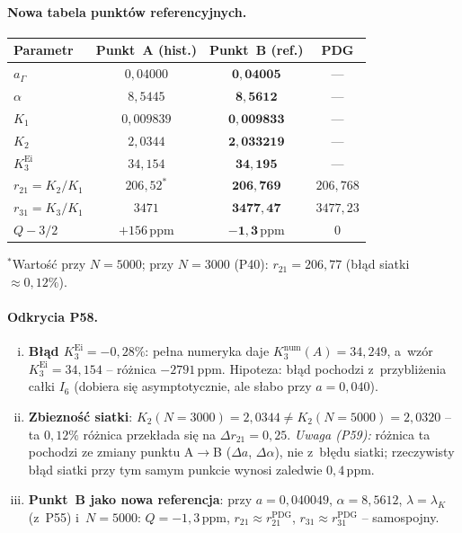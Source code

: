 \paragraph{Nowa tabela punkt\'ow referencyjnych.}
\begin{center}
\begin{tabular}{lccc}
\toprule
Parametr & Punkt~A (hist.) & Punkt~B (ref.) & PDG\\\midrule
$a_\Gamma$        & $0{,}04000$ & $\mathbf{0{,}04005}$ & --- \\
$\alpha$          & $8{,}5445$  & $\mathbf{8{,}5612}$  & --- \\
$K_1$             & $0{,}009839$& $\mathbf{0{,}009833}$& --- \\
$K_2$             & $2{,}0344$  & $\mathbf{2{,}033219}$& --- \\
$K_3^{\mathrm{Ei}}$ & $34{,}154$& $\mathbf{34{,}195}$  & --- \\
$r_{21}=K_2/K_1$  & $206{,}52^*$ & $\mathbf{206{,}769}$ & $206{,}768$ \\
$r_{31}=K_3/K_1$  & $3471$     & $\mathbf{3477{,}47}$ & $3477{,}23$ \\
$Q-3/2$           & $+156\,\mathrm{ppm}$ & $\mathbf{-1{,}3\,\mathrm{ppm}}$ & $0$\\\bottomrule
\end{tabular}
\end{center}
{\small $^*$Warto\'s\'c przy $N=5000$; przy $N=3000$ (P40): $r_{21}=206{,}77$
(b\l{}\k{a}d siatki $\approx0{,}12\%$).}

\paragraph{Odkrycia P58.}
\begin{enumerate}[(i)]
  \item \textbf{B\l{}\k{a}d $K_3^{\mathrm{Ei}}=-0{,}28\%$}:
        pe\l{}na numeryka daje $K_3^{\mathrm{num}}(A)=34{,}249$,
        a~wz\'or $K_3^{\mathrm{Ei}}=34{,}154$ -- r\'o\.znica $-2791\,\mathrm{ppm}$.
        Hipoteza: b\l{}\k{a}d pochodzi z~przybli\.zenia ca\l{}ki $I_6$
        (dobiera si\k{e} asymptotycznie, ale s\l{}abo przy $a=0{,}040$).
  \item \textbf{Zbiezno\'s\'c siatki}:
        $K_2(N=3000)=2{,}0344\neq K_2(N=5000)=2{,}0320$
        -- ta $0{,}12\%$ r\'o\.znica przek\l{}ada si\k{e}
        na $\Delta r_{21}=0{,}25$.
        \emph{Uwaga (P59):} r\'o\.znica ta pochodzi ze zmiany punktu
        A$\to$B ($\Delta a$, $\Delta\alpha$), nie z~b\l{}\k{e}du siatki;
        rzeczywisty b\l{}\k{a}d siatki przy tym samym punkcie
        wynosi zaledwie $0{,}4\,\mathrm{ppm}$.
  \item \textbf{Punkt~B jako nowa referencja}:
        przy $a=0{,}040049$, $\alpha=8{,}5612$, $\lambda=\lambda_K$
        (z~P55) i~$N=5000$: $Q=-1{,}3\,\mathrm{ppm}$,
        $r_{21}\approx r_{21}^{\mathrm{PDG}}$,
        $r_{31}\approx r_{31}^{\mathrm{PDG}}$ -- samospojny.
\end{enumerate}

